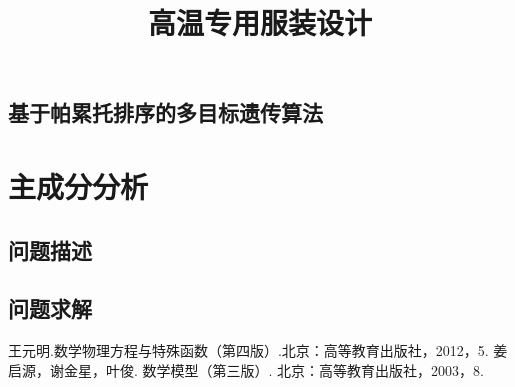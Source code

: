 \documentclass{cumcmthesis}
\title{高温专用服装设计}
\begin{document}
\def\dif{\mathrm{d}}
\fontsize{15}{18}\selectfont
\begin{abstract}
\end{abstract}
\tableofcontents
\subsection{基于帕累托排序的多目标遗传算法}
\section{主成分分析}
\subsection{问题描述}
\subsection{问题求解}
\begin{thebibliography}{9}%
王元明.数学物理方程与特殊函数（第四版）.北京：高等教育出版社，2012，5.
姜启源，谢金星，叶俊. 数学模型（第三版）. 北京：高等教育出版社，2003，8.
\end{thebibliography}
\newpage
\appendix
\end{document}
